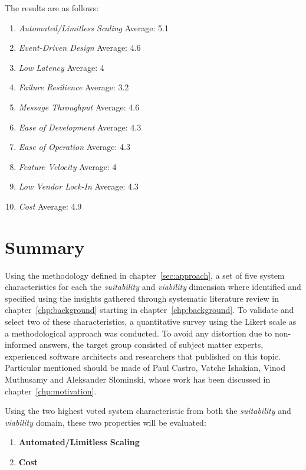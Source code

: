 \begin{minipage}{\textwidth}
    The results are as follows:
    
    \begin{enumerate}[nolistsep]\label{lst:surveyResults1}
        \item \textit{Automated/Limitless Scaling} Average: 5.1
        \item \textit{Event-Driven Design} Average: 4.6
        \item \textit{Low Latency} Average: 4
        \item \textit{Failure Resilience} Average: 3.2
        \item \textit{Message Throughput} Average: 4.6
        \item \textit{Ease of Development} Average: 4.3
        \item \textit{Ease of Operation} Average: 4.3
        \item \textit{Feature Velocity} Average: 4
        \item \textit{Low Vendor Lock-In} Average: 4.3
        \item \textit{Cost} Average: 4.9
    \end{enumerate}
\end{minipage}

\section{Summary}

Using the methodology defined in chapter~\vref{sec:approach}, a set of five system characteristics for each the \textit{suitability} and \textit{viability} dimension where identified and specified using the insights gathered through systematic literature review in chapter~\vref{chp:background} starting in chapter~\vref{chp:background}. To validate and select two of these characteristics, a quantitative survey using the Likert scale as a methodological approach was conducted. To avoid any distortion due to non-informed answers, the target group consisted of subject matter experts, experienced software architects and researchers that published on this topic. Particular mentioned should be made of Paul Castro, Vatche Ishakian, Vinod Muthusamy and Aleksander Slominski, whose work has been discussed in chapter~\vref{chp:motivation}. 

Using the two highest voted system characteristic from both the \textit{suitability} and \textit{viability} domain, these two properties will be evaluated:
\begin{enumerate}[nolistsep]
    \item \textbf{Automated/Limitless Scaling}
    \item \textbf{Cost}
\end{enumerate}
